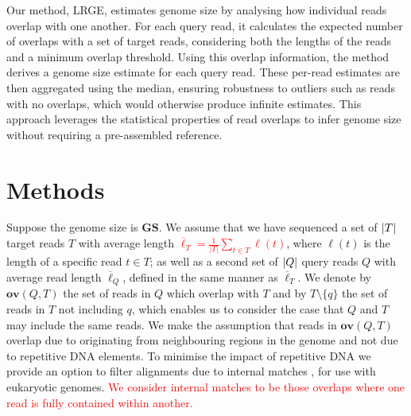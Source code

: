 \documentclass[unnumsec,webpdf,modern,large]{oup-authoring-template}
\theoremstyle{thmstyleone}%
\theoremstyle{thmstyletwo}%
\theoremstyle{thmstylethree}%
\newcommand{\overl}[2]{\mathbf{ov}(#1, #2)}
\DeclarePairedDelimiter\size{\lvert}{\rvert}
\newcommand{\gs}{\textbf{GS}}
\newcommand{\lrge}{LRGE}
\newcommand{\changed}[1]{\textcolor{red}{#1}}
\begin{document}
Our method, \lrge{}, estimates genome size by analysing how individual reads overlap with one another. For each query read, it calculates the expected number of overlaps with a set of target reads, considering both the lengths of the reads and a minimum overlap threshold. Using this overlap information, the method derives a genome size estimate for each query read. These per-read estimates are then aggregated using the median, ensuring robustness to outliers such as reads with no overlaps, which would otherwise produce infinite estimates. This approach leverages the statistical properties of read overlaps to infer genome size without requiring a pre-assembled reference.


\section{Methods}

Suppose the genome size is $\gs$. We assume that we have sequenced a set of $\size{T}$ target reads $T$ with average length \changed{$\overline{\ell}_T = \frac{1}{|T|} \sum_{t \in T} \ell(t)$}, where $\ell(t)$ is the length of a specific read $t \in T$; as well as a second set of $\size{Q}$ query reads $Q$ with average read length $\overline{\ell}_Q$, defined in the same manner as $\overline{\ell}_T$.  We denote by $\overl{Q}{T}$ the set of reads in $Q$ which overlap with $T$ and by $T \setminus \{q\}$ the set of reads in $T$ not including $q$, which enables us to consider the case that $Q$ and $T$ may include the same reads.  We make the assumption that reads in $\overl{Q}{T}$  overlap due to originating from neighbouring regions in the genome and not due to repetitive DNA elements. To minimise the impact of repetitive DNA we provide an option to filter alignments due to internal matches \citep{li2016minimap}, for use with eukaryotic genomes. \changed{We consider internal matches to be those overlaps where one read is fully contained within another.} 
\end{document}
